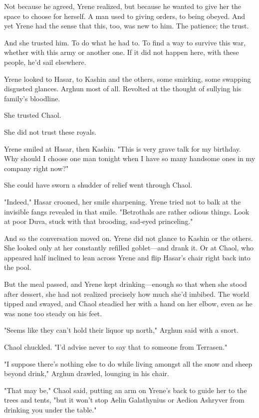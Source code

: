 Not because he agreed, Yrene realized, but because he wanted to give her the space to choose for herself.
A man used to giving orders, to being obeyed.
And yet Yrene had the sense that this, too, was new to him.
The patience; the trust.

And she trusted him.
To do what he had to.
To find a way to survive this war, whether with this army or another one.
If it did not happen here, with these people, he'd sail elsewhere.

Yrene looked to Hasar, to Kashin and the others, some smirking, some swapping disgusted glances.
Arghun most of all.
Revolted at the thought of sullying his family's bloodline.

She trusted Chaol.

She did not trust these royals.

Yrene smiled at Hasar, then Kashin.
"This is very grave talk for my birthday.
Why should I choose one man tonight when I have so many handsome ones in my company right now?"

She could have sworn a shudder of relief went through Chaol.

"Indeed," Hasar crooned, her smile sharpening.
Yrene tried not to balk at the invisible fangs revealed in that smile.
"Betrothals are rather odious things.
Look at poor Duva, stuck with that brooding, sad-eyed princeling."

And so the conversation moved on.
Yrene did not glance to Kashin or the others.
She looked only at her constantly refilled goblet---and drank it.
Or at Chaol, who appeared half inclined to lean across Yrene and flip Hasar's chair right back into the pool.

But the meal passed, and Yrene kept drinking---enough so that when she stood after dessert, she had not realized precisely how much she'd imbibed.
The world tipped and swayed, and Chaol steadied her with a hand on her elbow, even as he was none too steady on his feet.

"Seems like they can't hold their liquor up north," Arghun said with a snort.

Chaol chuckled.
"I'd advise never to say that to someone from Terrasen."

"I suppose there's nothing else to do while living amongst all the snow and sheep beyond drink," Arghun drawled, lounging in his chair.

"That may be," Chaol said, putting an arm on Yrene's back to guide her to the trees and tents, "but it won't stop Aelin Galathynius or Aedion Ashryver from drinking you under the table."


